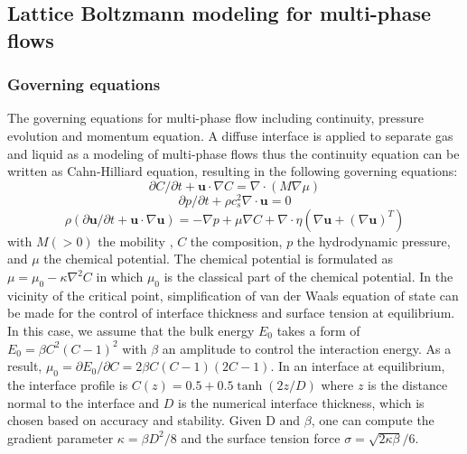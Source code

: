 \documentclass[10pt]{elsarticle}
\begin{document}
\subsection{Lattice Boltzmann modeling for multi-phase flows}
\subsubsection{Governing equations}
The governing equations for multi-phase flow including continuity, pressure evolution and momentum equation. A diffuse interface is applied to separate gas and liquid as a modeling of multi-phase flows thus the continuity equation can be written as Cahn-Hilliard equation, resulting in the following governing equations:
\begin{equation}
\partial C/\partial t+\textbf{u} \cdot \nabla C=\nabla \cdot(M\nabla \mu)
\label{eq:C-eq}
\end{equation}
\begin{equation}
\partial p/\partial t+\rho c_{s}^{2}\nabla \cdot \textbf{u}  =0
\label{eq:p-evolution}
\end{equation}
\begin{equation}
\rho(\partial \textbf{u}/\partial t+\textbf{u}  \cdot\nabla \textbf{u})  =-\nabla p+\mu\nabla C+\nabla \cdot \eta (\nabla \textbf{u}+ (\nabla \textbf{u})^{T})
\label{eq:momentum}
\end{equation}
with $M(> 0)$ the mobility \cite{rf:Carpinlioglu01}, $C$ the composition, $p$ the hydrodynamic pressure, and $\mu$ the chemical potential.  The chemical potential is formulated as  $\mu=\mu_0-\kappa\nabla^2C$ in which $\mu_0$ is the classical part of the chemical potential. In the vicinity of the critical point, simplification of van der Waals equation of state can be made\cite{rf:Rowlinson89} for the control of interface thickness and surface tension at equilibrium. In this case, we assume that the bulk energy $E_0$ takes a form\cite{rf:Jamet01} of $E_0 = \beta C^2(C-1)^2$ with $\beta$ an amplitude to control the interaction energy. As a result, $\mu_0=\partial E_0/\partial C=2\beta C(C-1)(2C-1)$. In an interface at equilibrium, the interface profile is $C(z)=0.5+0.5\tanh{(2z/D)}$ where $z$ is the distance normal to the interface and $D$ is the numerical interface thickness, which is chosen based on accuracy and stability. Given D and $\beta$, one can compute the gradient parameter $\kappa=\beta D^2/8$ and the surface tension force $\sigma=\sqrt{2\kappa\beta}/6$. 
\end{document}
